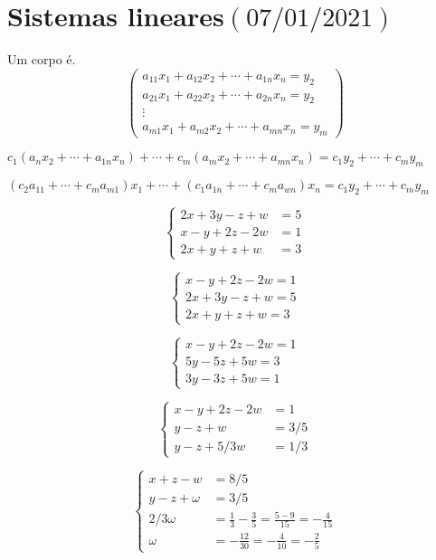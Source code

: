 \chapter{Sistemas lineares\quad$\left(07/01/2021\right)$}

\begin{definition}
  Um corpo é.
  \[
    \begin{pmatrix}
      a_{11} x_{1}+a_{12} x_{2}+\cdots+a_{1n} x_{n}=y_{2} \\
      a_{21} x_{1}+a_{22} x_{2}+\cdots+a_{2n} x_{n}=y_{2} \\
      \vdots                                              \\
      a_{m1} x_{1}+a_{m2} x_{2}+\cdots+a_{mn} x_{n}=y_{m}
    \end{pmatrix}
  \]
\end{definition}


$c_{1}\left(a_{n}x_{2}+\cdots+a_{1n}x_{n}\right)+
  \cdots+
  c_{m}\left(a_{m}x_{2}+\cdots+a_{mn}x_{n}\right)=
  c_{1}y_{2}+\cdots+c_{m}y_{m}$

$\left(c_{2}a_{11}+\cdots+c_{m}a_{m1}\right)
  x_{1}+\cdots+\left(c_{1}a_{1n}+\cdots+c_{m}a_{w n}\right)
  x_{n}=
  c_{1}y_{2}+\cdots+c_{m}y_{m}$

\[
  \left\{\begin{aligned}
    2 x+3 y-z+w & =5 \\
    x-y+2 z-2 w & =1 \\
    2 x+y+z+w   & =3
  \end{aligned}\right.
\]

\[  \left\{\begin{array}{l}
    x-y+2 z-2 w=1 \\
    2 x+3 y-z+w=5 \\
    2 x+y+z+w=3
  \end{array}\right.
\]

\[
  \left\{\begin{array}{l}
    x-y+2 z-2 w=1 \\
    5 y-5 z+5 w=3 \\
    3 y-3 z+5 w=1
  \end{array}\right.
\]

\[
  \left\{\begin{aligned}
    x-y+2 z-2 w & =1     \\
    y-z+w       & =3 / 5 \\
    y-z+5 / 3 w & =1 / 3
  \end{aligned}\right.
\]

\[
  \left\{\begin{aligned}
    x+z-w        & =8 / 5                                                \\
    y-z+\omega   & =3 / 5                                                \\
    2 / 3 \omega & =\frac{1}{3}-\frac{3}{5}=\frac{5-9}{15}=-\frac{4}{15} \\
    \omega       & =-\frac{12}{30}=-\frac{4}{10}=-\frac{2}{5}
  \end{aligned}\right.
\]

